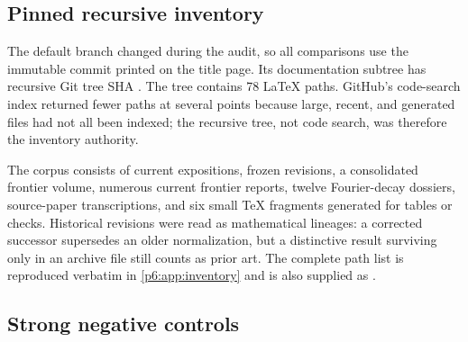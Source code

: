 \documentclass[11pt]{article}
\numberwithin{equation}{section}
\theoremstyle{definition}
\theoremstyle{remark}
\begin{document}
\subsection{Pinned recursive inventory}

The default branch changed during the audit, so all comparisons use the immutable commit
printed on the title page.  Its documentation subtree has recursive Git tree SHA
.  The tree contains 78 LaTeX
paths.  GitHub's code-search index returned fewer paths at several points because large,
recent, and generated files had not all been indexed; the recursive tree, not code search,
was therefore the inventory authority.

The corpus consists of current expositions, frozen revisions, a consolidated frontier
volume, numerous current frontier reports, twelve Fourier-decay dossiers, source-paper
transcriptions, and six small TeX fragments generated for tables or checks.  Historical
revisions were read as mathematical lineages: a corrected successor supersedes an older
normalization, but a distinctive result surviving only in an archive file still counts as
prior art.  The complete path list is reproduced verbatim in \cref{p6:app:inventory} and is
also supplied as
 \cite{p6:proveit}.

\subsection{Strong negative controls}
\end{document}
